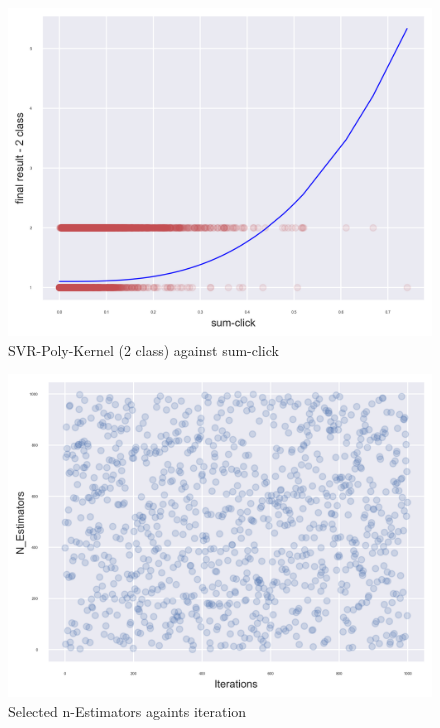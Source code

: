\documentclass[11pt, a4paper]{article}
\begin{document}
\begin{multicols}{2}
\centering
\begin{figure}[H]
	\vspace{-0.4cm}
	\includegraphics[width=\linewidth]{SVR-Polynomial-Kernel_2_class_model_against_sum-click.png} 
	\caption{SVR-Poly-Kernel (2 class) against sum-click}
	\label{fig:PolyClicks}
\end{figure}

\centering
\begin{figure}[H]
	\vspace{-0.4cm}
	\includegraphics[width=\linewidth]{Estimators_against_iteration.png} 
	\caption{Selected n-Estimators againts iteration}
	\label{fig:estimators}
\end{figure}


\end{multicols}
\end{document}
